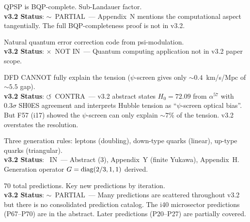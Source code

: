 \documentclass[11pt,a4paper]{article}
\newcommand{\vin}{\textcolor{statusIN}{\checkmark~IN}}
\newcommand{\vpartial}{\textcolor{statusPARTIAL}{$\sim$~PARTIAL}}
\newcommand{\vnot}{\textcolor{statusNOT}{$\times$~NOT IN}}
\newcommand{\vcontra}{\textcolor{statusCONTRA}{$\circlearrowleft$~CONTRA}}
\begin{document}
\begin{tcolorbox}[colback=technical!5,colframe=technical,title=\textbf{F55: BQP-Completeness of Psi-Field Simulation (P10)}]
QPSP is BQP-complete. Sub-Landauer factor.\\
\textbf{v3.2 Status}: \vpartial\ --- Appendix~N mentions the computational aspect tangentially. The full BQP-completeness proof is not in v3.2.
\end{tcolorbox}

\begin{tcolorbox}
Natural quantum error correction code from psi-modulation.\\
\textbf{v3.2 Status}: \vnot\ --- Quantum computing application not in v3.2 paper scope.
\end{tcolorbox}

\begin{tcolorbox}[colback=technical!5,colframe=technical,title=\textbf{F57: Hubble Tension $\Delta H_0 = 3.9 \pm 1.1$~km/s/Mpc}]
DFD CANNOT fully explain the tension ($\psi$-screen gives only $\sim 0.4$~km/s/Mpc of $\sim 5.5$ gap).\\
\textbf{v3.2 Status}: \vcontra\ --- v3.2 abstract states $H_0 = 72.09$ from $\alpha^{57}$ with $0.3\sigma$ SH0ES agreement and interprets Hubble tension as ``$\psi$-screen optical bias''. But F57 (i17) showed the $\psi$-screen can only explain $\sim 7\%$ of the tension. v3.2 overstates the resolution.
\end{tcolorbox}

\begin{tcolorbox}[colback=technical!5,colframe=technical,title=\textbf{F58: Spin$^c$ Bundle Exponents $n_f$ for All 9 Fermions}]
Three generation rules: leptons (doubling), down-type quarks (linear), up-type quarks (triangular).\\
\textbf{v3.2 Status}: \vin\ --- Abstract (3), Appendix~Y (finite Yukawa), Appendix~H. Generation operator $G = {\rm diag}(2/3,1,1)$ derived.
\end{tcolorbox}

\begin{tcolorbox}[colback=technical!5,colframe=technical,title=\textbf{F59: New Predictions Generated (P1--P70)}]
70 total predictions. Key new predictions by iteration.\\
\textbf{v3.2 Status}: \vpartial\ --- Many predictions are scattered throughout v3.2 but there is no consolidated prediction catalog. The i40 microsector predictions (P67--P70) are in the abstract. Later predictions (P20--P27) are partially covered.
\end{tcolorbox}
\end{document}
